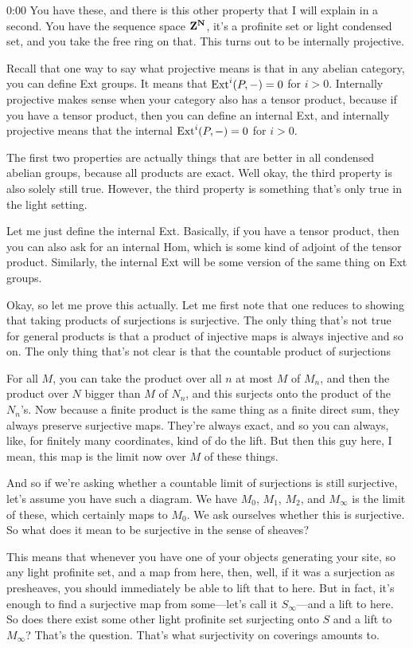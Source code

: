 \begin{unfinished}{0:00}
You have these, and there is this other property that I will explain in a second. You have the sequence space $\mathbf Z^\mathbf N$, it's a profinite set or light condensed set, and you take the free ring on that. This turns out to be internally projective.

Recall that one way to say what projective means is that in any abelian category, you can define Ext groups. It means that $\operatorname{Ext}^i(P,-)=0$ for $i>0$. Internally projective makes sense when your category also has a tensor product, because if you have a tensor product, then you can define an internal Ext, and internally projective means that the internal $\operatorname{Ext}^i(P,-)=0$ for $i>0$.

The first two properties are actually things that are better in all condensed abelian groups, because all products are exact. Well okay, the third property is also solely still true. However, the third property is something that's only true in the light setting.

Let me just define the internal Ext. Basically, if you have a tensor product, then you can also ask for an internal Hom, which is some kind of adjoint of the tensor product. Similarly, the internal Ext will be some version of the same thing on Ext groups.

Okay, so let me prove this actually. Let me first note that one reduces to showing that taking products of surjections is surjective. The only thing that's not true for general products is that a product of injective maps is always injective and so on. The only thing that's not clear is that the countable product of surjections

For all $M$, you can take the product over all $n$ at most $M$ of $M_n$, and then the product over $N$ bigger than $M$ of $N_n$, and this surjects onto the product of the $N_n$'s. Now because a finite product is the same thing as a finite direct sum, they always preserve surjective maps. They're always exact, and so you can always, like, for finitely many coordinates, kind of do the lift. But then this guy here, I mean, this map is the limit now over $M$ of these things.

And so if we're asking whether a countable limit of surjections is still surjective, let's assume you have such a diagram. We have $M_0$, $M_1$, $M_2$, and $M_\infty$ is the limit of these, which certainly maps to $M_0$. We ask ourselves whether this is surjective. So what does it mean to be surjective in the sense of sheaves?

This means that whenever you have one of your objects generating your site, so any light profinite set, and a map from here, then, well, if it was a surjection as presheaves, you should immediately be able to lift that to here. But in fact, it's enough to find a surjective map from some---let's call it $S_\infty$---and a lift to here. So does there exist some other light profinite set surjecting onto $S$ and a lift to $M_\infty$? That's the question. That's what surjectivity on coverings amounts to.


\end{unfinished}
